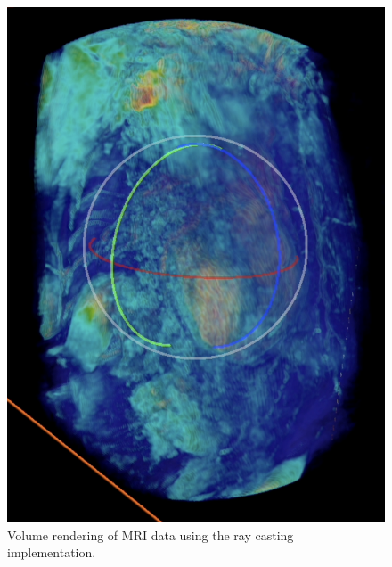 \documentclass{article}
\begin{document}
\begin{figure}[tbh]
    \centering
    \begin{minipage}[b]{0.49\textwidth}
        \centering
        \includegraphics[width=\textwidth]{images/volume1.png}
        \caption{Volume rendering of MRI data using the ray casting implementation.}
        \label{fig:transferFunction1}
    \end{minipage}
    \hfill
    \begin{minipage}[b]{0.49\textwidth}
        \centering

\end{minipage}
\end{figure}
\end{document}
